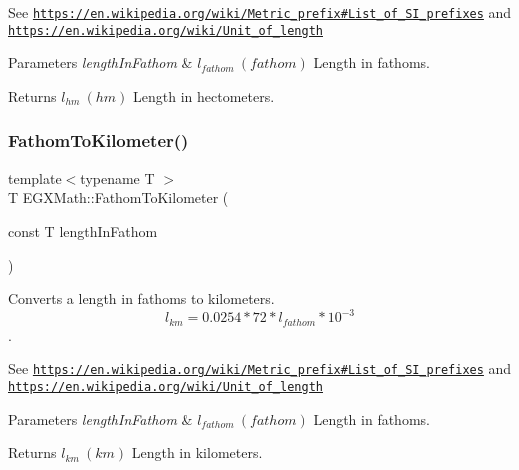 See \href{https://en.wikipedia.org/wiki/Metric_prefix#List_of_SI_prefixes}{\tt https\+://en.\+wikipedia.\+org/wiki/\+Metric\+\_\+prefix\#\+List\+\_\+of\+\_\+\+S\+I\+\_\+prefixes} and \href{https://en.wikipedia.org/wiki/Unit_of_length}{\tt https\+://en.\+wikipedia.\+org/wiki/\+Unit\+\_\+of\+\_\+length} 
\begin{DoxyParams}{Parameters}
{\em length\+In\+Fathom} & $ l_{fathom}\ (fathom)$ Length in fathoms. \\
\hline
\end{DoxyParams}
\begin{DoxyReturn}{Returns}
$ l_{hm}\ (hm)$ Length in hectometers. 
\end{DoxyReturn}
\mbox{\label{group___e_g_x_math-_conversions-_length_conversions-_imperial-_fathom-_s_i_gaa94789483238000a82b01720546e84d7}} 
\subsubsection{\texorpdfstring{Fathom\+To\+Kilometer()}{FathomToKilometer()}}
{\footnotesize\ttfamily template$<$typename T $>$ \\
T E\+G\+X\+Math\+::\+Fathom\+To\+Kilometer (\begin{DoxyParamCaption}\item[{const T}]{length\+In\+Fathom }\end{DoxyParamCaption})}



Converts a length in fathoms to kilometers. \[ l_{km}=0.0254 * 72 * l_{fathom} * 10^{-3} \]. 

See \href{https://en.wikipedia.org/wiki/Metric_prefix#List_of_SI_prefixes}{\tt https\+://en.\+wikipedia.\+org/wiki/\+Metric\+\_\+prefix\#\+List\+\_\+of\+\_\+\+S\+I\+\_\+prefixes} and \href{https://en.wikipedia.org/wiki/Unit_of_length}{\tt https\+://en.\+wikipedia.\+org/wiki/\+Unit\+\_\+of\+\_\+length} 
\begin{DoxyParams}{Parameters}
{\em length\+In\+Fathom} & $ l_{fathom}\ (fathom)$ Length in fathoms. \\
\hline
\end{DoxyParams}
\begin{DoxyReturn}{Returns}
$ l_{km}\ (km)$ Length in kilometers. 
\end{DoxyReturn}
\mbox{\label{group___e_g_x_math-_conversions-_length_conversions-_imperial-_fathom-_s_i_ga143cda5a2c5c3914831736330058809b}} 
